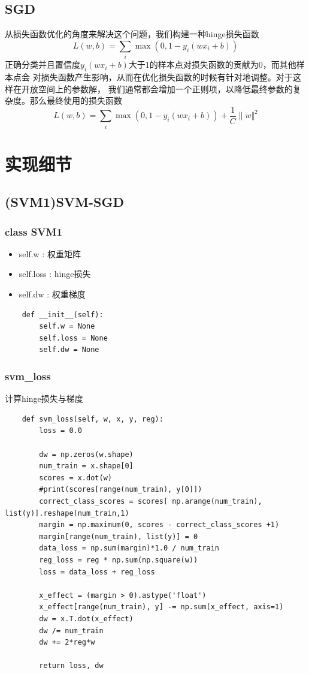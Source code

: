 \documentclass[12pt, a4paper, oneside]{ctexart}
\begin{document}
\subsection*{SGD}
从损失函数优化的角度来解决这个问题，我们构建一种hinge损失函数
$$L(w,b)=\sum_{i}\max(0,1-y_{i}(wx_{i}+b))$$
正确分类并且置信度$y_{i}(wx_{i}+b)$大于1的样本点对损失函数的贡献为0，而其他样本点会
对损失函数产生影响，从而在优化损失函数的时候有针对地调整。对于这样在开放空间上的参数解，
我们通常都会增加一个正则项，以降低最终参数的复杂度。那么最终使用的损失函数
$$L(w,b)=\sum_{i}\max(0,1-y_{i}(wx_{i}+b))+\frac{1}{C}\|w\Vert^{2}$$
\section*{实现细节}
\subsection*{(SVM1)SVM-SGD}
\subsubsection*{class SVM1}
\begin{itemize}
    \item self.w : 权重矩阵
    \item self.loss : hinge损失
    \item self.dw : 权重梯度
\end{itemize}
\begin{lstlisting}
    def __init__(self):
        self.w = None
        self.loss = None
        self.dw = None
\end{lstlisting}

\subsubsection*{svm\_loss}
计算hinge损失与梯度
\begin{lstlisting}
    def svm_loss(self, w, x, y, reg):
        loss = 0.0
        
        dw = np.zeros(w.shape)
        num_train = x.shape[0]
        scores = x.dot(w)
        #print(scores[range(num_train), y[0]])
        correct_class_scores = scores[ np.arange(num_train), list(y)].reshape(num_train,1)
        margin = np.maximum(0, scores - correct_class_scores +1)
        margin[range(num_train), list(y)] = 0
        data_loss = np.sum(margin)*1.0 / num_train
        reg_loss = reg * np.sum(np.square(w))
        loss = data_loss + reg_loss
        
        x_effect = (margin > 0).astype('float')
        x_effect[range(num_train), y] -= np.sum(x_effect, axis=1)
        dw = x.T.dot(x_effect)
        dw /= num_train
        dw += 2*reg*w
        
        return loss, dw
\end{lstlisting}
\end{document}
